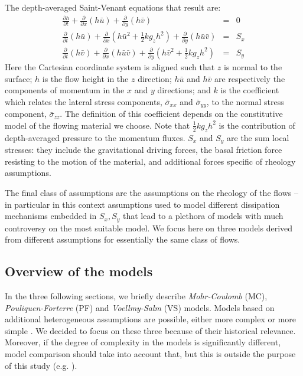 \documentclass{article}
\begin{document}
The depth-averaged Saint-Venant equations that result are:
\begin{eqnarray}
\label{eq:D_A}
\frac{\partial h}{\partial t} +
\frac{\partial}{\partial x}(h \bar{u}) +
\frac{\partial}{\partial y}(h\bar{v}) &=& 0 \nonumber \\
\frac{\partial}{\partial t} (h\bar{u}) +
\frac{\partial}{\partial x}\left(h\bar{u}^2 + \frac{1}{2}k g_{z}h^2\right) + \frac{\partial}{\partial y}(h\bar{u}\bar{v}) &=& S_{x}\\
\frac{\partial}{\partial t} (h\bar{v}) +
\frac{\partial}{\partial x}(h\bar{u}\bar{v}) +
\frac{\partial}{\partial y}\left(h\bar{v}^2 + \frac{1}{2}k g_{z}h^2\right) &=& S_{y} \nonumber
\end{eqnarray}
Here the Cartesian coordinate system is aligned such that $z$ is normal to the surface; $h$ is the flow height in the $z$ direction; $h\bar{u}$ and $h\bar{v}$ are respectively the components of momentum in the $x$ and $y$ directions; and $k$ is the coefficient which relates the lateral stress components, $\bar{\sigma}_{xx}$ and $\bar{\sigma}_{yy}$, to the normal stress component, $\bar{\sigma}_{zz}$. The definition of this coefficient depends on the constitutive model of the flowing material we choose. Note that $\frac{1}{2} k g_z h^2$ is the contribution of depth-averaged pressure to the momentum fluxes. $S_x$ and $S_y$ are the sum local stresses: they include the gravitational driving forces, the basal friction force resisting to the motion of the material, and additional forces specific of rheology assumptions.

The final class of assumptions are the assumptions on the rheology of the flows -- in particular in this context assumptions used to model different dissipation mechanisms embedded in $S_x, S_y$ that lead to a plethora of models with much controversy on the most suitable model. We focus here on three models derived from different assumptions for essentially the same class of flows.

\subsection{Overview of the models}\label{subsec:Models}
In the three following sections, we briefly describe \emph{Mohr-Coulomb} (MC), \emph{Pouliquen-Forterre} (PF) and \emph{Voellmy-Salm} (VS) models. Models based on additional heterogeneous assumptions are possible, either more complex \citep{PitmanLe2005,Iverson2014} or more simple \citep{DadeHuppert1998}. We decided to focus on these three because of their historical relevance. Moreover, if the degree of complexity in the models is significantly different, model comparison should take into account that, but this is outside the purpose of this study (e.g. \citep{Farrell2015}).
\end{document}
